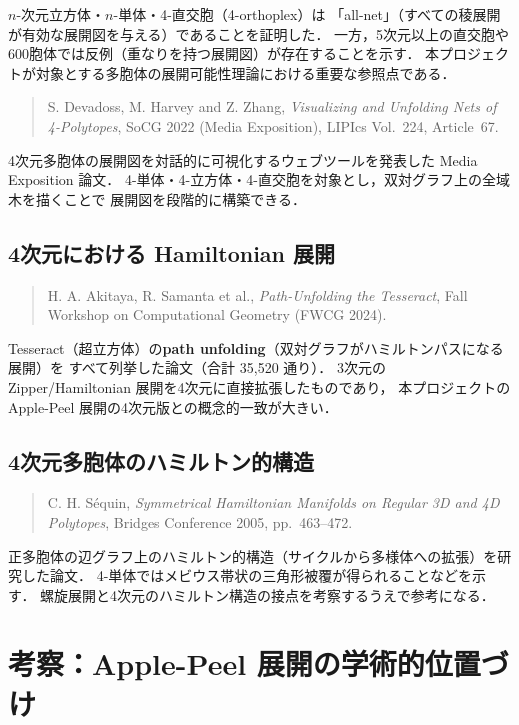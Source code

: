 \documentclass[a4paper,11pt]{article}
\begin{document}
$n$-次元立方体・$n$-単体・4-直交胞（4-orthoplex）は
「all-net」（すべての稜展開が有効な展開図を与える）であることを証明した．
一方，5次元以上の直交胞や600胞体では反例（重なりを持つ展開図）が存在することを示す．
本プロジェクトが対象とする多胞体の展開可能性理論における重要な参照点である．

\begin{quotation}\noindent
  S. Devadoss, M. Harvey and Z. Zhang,
  \textit{Visualizing and Unfolding Nets of 4-Polytopes},
  SoCG 2022 (Media Exposition), LIPIcs Vol.~224, Article~67.
\end{quotation}

4次元多胞体の展開図を対話的に可視化するウェブツールを発表した Media Exposition 論文．
4-単体・4-立方体・4-直交胞を対象とし，双対グラフ上の全域木を描くことで
展開図を段階的に構築できる．

\subsection{4次元における Hamiltonian 展開}

\begin{quotation}\noindent
  H. A. Akitaya, R. Samanta et al.,
  \textit{Path-Unfolding the Tesseract},
  Fall Workshop on Computational Geometry (FWCG 2024).
\end{quotation}

Tesseract（超立方体）の\textbf{path unfolding}（双対グラフがハミルトンパスになる展開）を
すべて列挙した論文（合計 35,520 通り）．
3次元の Zipper/Hamiltonian 展開を4次元に直接拡張したものであり，
本プロジェクトの Apple-Peel 展開の4次元版との概念的一致が大きい．

\subsection{4次元多胞体のハミルトン的構造}

\begin{quotation}\noindent
  C. H. Séquin,
  \textit{Symmetrical Hamiltonian Manifolds on Regular 3D and 4D Polytopes},
  Bridges Conference 2005, pp.~463--472.
\end{quotation}

正多胞体の辺グラフ上のハミルトン的構造（サイクルから多様体への拡張）を研究した論文．
4-単体ではメビウス帯状の三角形被覆が得られることなどを示す．
螺旋展開と4次元のハミルトン構造の接点を考察するうえで参考になる．

\section{考察：Apple-Peel 展開の学術的位置づけ}
\end{document}

